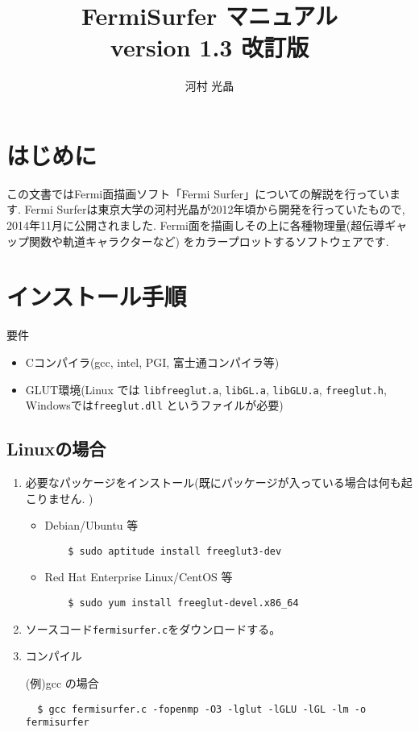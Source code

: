 \documentclass[12pt]{jarticle}
\begin{document}
%
%
\title{FermiSurfer マニュアル \\
version 1.3 改訂版}
\author{河村 光晶}
\maketitle

\tableofcontents

\section{はじめに}

この文書ではFermi面描画ソフト「Fermi Surfer」についての解説を行っています. 
Fermi Surferは東京大学の河村光晶が2012年頃から開発を行っていたもので, 
2014年11月に公開されました. 
Fermi面を描画しその上に各種物理量(超伝導ギャップ関数や軌道キャラクターなど)
をカラープロットするソフトウェアです. 

\section{インストール手順}

要件
\begin{itemize}
\item Cコンパイラ(gcc, intel, PGI, 富士通コンパイラ等)
\item GLUT環境(Linux では
  \texttt{libfreeglut.a}, \texttt{libGL.a}, \texttt{libGLU.a},
 \texttt{freeglut.h}, Windowsでは\texttt{freeglut.dll} というファイルが必要)
\end{itemize}

\subsection{Linuxの場合}

\begin{enumerate}

\item 必要なパッケージをインストール(既にパッケージが入っている場合は何も起こりません. )

  \begin{itemize}
  \item Debian/Ubuntu 等
    \begin{verbatim}
    $ sudo aptitude install freeglut3-dev
    \end{verbatim}
  \item Red Hat Enterprise Linux/CentOS 等
    \begin{verbatim}
    $ sudo yum install freeglut-devel.x86_64
    \end{verbatim}
  \end{itemize}

\item ソースコード\texttt{fermisurfer.c}をダウンロードする。

\item コンパイル

(例)gcc の場合

\begin{verbatim}
  $ gcc fermisurfer.c -fopenmp -O3 -lglut -lGLU -lGL -lm -o fermisurfer
\end{verbatim}

\end{enumerate}
\end{document}
